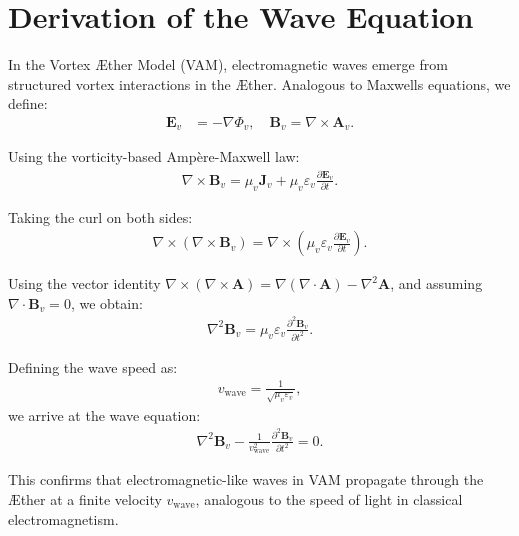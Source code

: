 
\section{Derivation of the Wave Equation}

In the Vortex Æther Model (VAM), electromagnetic waves emerge from structured vortex interactions in the Æther. Analogous to Maxwell\rqs s equations, we define:
\begin{align}
    \mathbf{E}_v &= -\nabla \Phi_v, \quad \mathbf{B}_v = \nabla \times \mathbf{A}_v.
\end{align}

Using the vorticity-based Ampère-Maxwell law:
\begin{align}
    \nabla \times \mathbf{B}_v = \mu_v \mathbf{J}_v + \mu_v \varepsilon_v \frac{\partial \mathbf{E}_v}{\partial t}.
\end{align}

Taking the curl on both sides:
\begin{align}
    \nabla \times (\nabla \times \mathbf{B}_v) = \nabla \times \left(\mu_v \varepsilon_v \frac{\partial \mathbf{E}_v}{\partial t} \right).
\end{align}

Using the vector identity \( \nabla \times (\nabla \times \mathbf{A}) = \nabla (\nabla \cdot \mathbf{A}) - \nabla^2 \mathbf{A} \), and assuming \(\nabla \cdot \mathbf{B}_v = 0\), we obtain:
\begin{align}
    \nabla^2 \mathbf{B}_v = \mu_v \varepsilon_v \frac{\partial^2 \mathbf{B}_v}{\partial t^2}.
\end{align}

Defining the wave speed as:
\begin{align}
    v_\text{wave} = \frac{1}{\sqrt{\mu_v \varepsilon_v}},
\end{align}
we arrive at the wave equation:
\begin{align}
    \nabla^2 \mathbf{B}_v - \frac{1}{v_\text{wave}^2} \frac{\partial^2 \mathbf{B}_v}{\partial t^2} = 0.
\end{align}

This confirms that electromagnetic-like waves in VAM propagate through the Æther at a finite velocity \( v_\text{wave} \), analogous to the speed of light in classical electromagnetism.